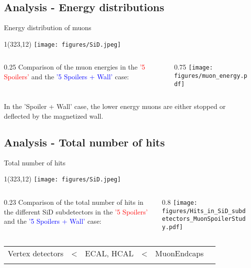 \documentclass[xcolor={dvipsnames}]{beamer}
\newcommand{\sidlogo}{
  \setlength{\TPHorizModule}{1pt}
  \setlength{\TPVertModule}{1pt}
  \begin{textblock}{1}(323,12)
   \texttt{[image: figures/SiD.jpeg]}
  \end{textblock}
  }
\begin{document}
\subsection{Analysis - Energy distributions}
\begin{frame}{Energy distribution of muons}
\sidlogo
\begin{columns}
 \begin{column}{0.25\textwidth}
 \small
  Comparison of the muon energies in the \textcolor{red}{'5 Spoilers'} and the \textcolor{blue}{'5 Spoilers + Wall'} case:
 \end{column}
 \begin{column}{0.75\textwidth}
  \texttt{[image: figures/muon\_energy.pdf]}
 \end{column}
\end{columns}
In the 'Spoiler + Wall' case, the lower energy muons are either stopped or deflected by the magnetized wall.
\end{frame}

\subsection{Analysis - Total number of hits}
\begin{frame}{Total number of hits}
\sidlogo
\begin{columns}
 \begin{column}{0.23\textwidth}
 \small
  Comparison of the total number of hits in the different SiD subdetectors in the \textcolor{red}{'5 Spoilers'} and the \textcolor{blue}{'5 Spoilers + Wall'} case:
 \end{column}
 \begin{column}{0.8\textwidth}
\texttt{[image: figures/Hits\_in\_SiD\_subdetectors\_MuonSpoilerStudy.pdf]}
 \end{column}
\end{columns}
\begin{center}
\begin{tabular}{@{}p{}p{}p{}p{}p{}p{}@{}}
 \centering Vertex detectors & < & \centering ECAL, HCAL & < & \centering MuonEndcaps & \\
  \centering{\scriptsize Smallest effective detector area} & &  \centering{\scriptsize Particle showers} & &  \centering{\scriptsize Biggest effective detector area}&
\end{tabular}
\end{center}
\end{frame}
\end{document}

